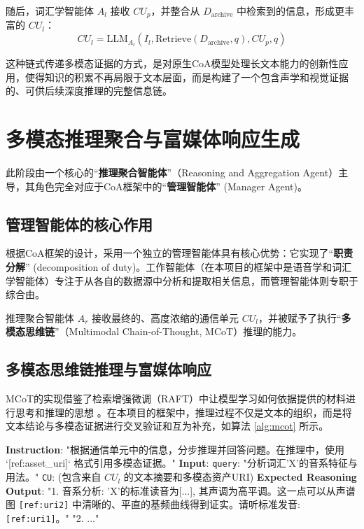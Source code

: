 随后，词汇学智能体 $A_l$ 接收 $CU_p$，并整合从 $D_{\text{archive}}$ 中检索到的信息，形成更丰富的 $CU_l$：
\begin{equation}
    CU_l = \text{LLM}_{A_l} (I_l, \text{Retrieve}(D_{\text{archive}}, q), CU_p, q)
    \label{eq:cu_l}
\end{equation}

这种链式传递多模态证据的方式，是对原生CoA模型处理长文本能力的创新性应用，使得知识的积累不再局限于文本层面，而是构建了一个包含声学和视觉证据的、可供后续深度推理的完整信息链。

\section{多模态推理聚合与富媒体响应生成}
此阶段由一个核心的“\textbf{推理聚合智能体}”（Reasoning and Aggregation Agent）主导，其角色完全对应于CoA框架中的“\textbf{管理智能体}” (Manager Agent)。

\subsection{管理智能体的核心作用}
根据CoA框架的设计，采用一个独立的管理智能体具有核心优势：它实现了“\textbf{职责分解}” (decomposition of duty)。工作智能体（在本项目的框架中是语音学和词汇学智能体）专注于从各自的数据源中分析和提取相关信息，而管理智能体则专职于综合由。

推理聚合智能体 $A_r$ 接收最终的、高度浓缩的通信单元 $CU_l$，并被赋予了执行“\textbf{多模态思维链}”（Multimodal Chain-of-Thought, MCoT）推理的能力。

\subsection{多模态思维链推理与富媒体响应}
MCoT的实现借鉴了检索增强微调（RAFT）中让模型学习如何依据提供的材料进行思考和推理的思想 。在本项目的框架中，推理过程不仅是文本的组织，而是将文本结论与多模态证据进行交叉验证和互为补充，如算法 \ref{alg:mcot} 所示。

\begin{algorithm}[h!]
    \caption{多模态思维链（MCoT）推理提示模板}
    \label{alg:mcot}
    \small
    \begin{algorithmic}[1]
        \State \textbf{Instruction}: "根据通信单元中的信息，分步推理并回答问题。在推理中，使用 `[ref:asset\_uri]` 格式引用多模态证据。"
        \State \textbf{Input}:
        \State \quad \texttt{query}: "分析词汇'X'的音系特征与用法。"
        \State \quad \texttt{CU}: (包含来自 $CU_l$ 的文本摘要和多模态资产URI)
        \State \textbf{Expected Reasoning Output}:
        \State \quad "1. 音系分析: 'X'的标准读音为[...], 其声调为高平调。这一点可以从声谱图 \texttt{[ref:uri2]} 中清晰的、平直的基频曲线得到证实。请听标准发音: \texttt{[ref:uri1]}。"
        \State \quad "2. ..."
    \end{algorithmic}
\end{algorithm}

